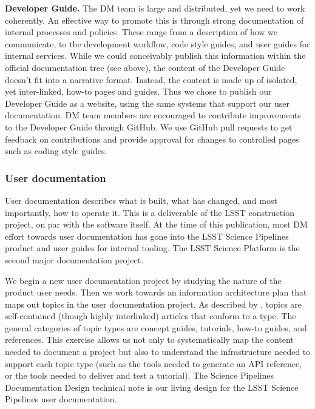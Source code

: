 \noindent \textbf{Developer Guide.}
The DM team is large and distributed, yet we need to work coherently.
An effective way to promote this is through strong documentation of internal processes and policies.
These range from a description of how we communicate, to the development workflow, code style guides, and user guides for internal services.
While we could conceivably publish this information within the official documentation tree (see above), the content of the Developer Guide doesn't fit into a narrative format.
Instead, the content is made up of isolated, yet inter-linked, how-to pages and guides.
Thus we chose to publish our Developer Guide as a website,\cite{devguide} using the same systems that support our user documentation.
DM team members are encouraged to contribute improvements to the Developer Guide through GitHub.
We use GitHub pull requests to get feedback on contributions and provide approval for changes to controlled pages such as coding style guides.

\subsubsection{User documentation}
\label{sec:user_docs}

User documentation describes what is built, what has changed, and most importantly, how to operate it.
This is a deliverable of the LSST construction project, on par with the software itself.
At the time of this publication, most DM effort towards user documentation has gone into the LSST Science Pipelines product\cite{pipelines-guide} and user guides for internal tooling.
The LSST Science Platform\cite{LSE-319} is the second major documentation project.

We begin a new user documentation project by studying the nature of the product user needs.
Then we work towards an information architecture plan that maps out topics in the user documentation project.
As described by , topics are self-contained (though highly interlinked) articles that conform to a type.
The general categories of topic types are concept guides, tutorials, how-to guides, and references.\cite{Procida:2017}
This exercise allows us not only to systematically map the content needed to document a project but also to understand the infrastructure needed to support each topic type (such as the tools needed to generate an API reference, or the tools needed to deliver and test a tutorial).
The Science Pipelines Documentation Design\cite{DMTN-030} technical note is our living design for the LSST Science Pipelines user documentation.
